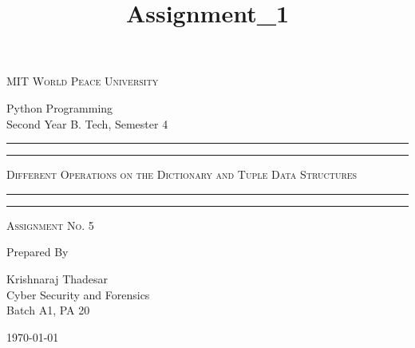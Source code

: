 \documentclass[11pt]{article}
\title{Assignment\_1}
\begin{document}
\begin{titlepage}
	\centering


	\huge\textsc{
		MIT World Peace University
	}\\

	\vspace{0.75\baselineskip} %

	\LARGE{
		Python Programming\\
		Second Year B. Tech, Semester 4
	}

	\vfill %


	\rule{\textwidth}{1.6pt}\vspace*{-\baselineskip}\vspace*{2pt}
	\rule{\textwidth}{0.6pt}
	\vspace{0.75\baselineskip} %



	\huge{\textsc{
			Different Operations on the Dictionary and Tuple Data Structures
		}} \\



	\vspace{0.5\baselineskip} %
	\rule{\textwidth}{0.6pt}\vspace*{-\baselineskip}\vspace*{2.8pt}
	\rule{\textwidth}{1.6pt}

	\vspace{1\baselineskip} %


	\LARGE\textsc{
		Assignment No. 5
	} %
	\vfill


	Prepared By
	\vspace{0.5\baselineskip} %

	\Large{
		Krishnaraj Thadesar \\
		Cyber Security and Forensics\\
		Batch A1, PA 20
	}


	\vspace{0.5\baselineskip} %
	\today

\end{titlepage}
\end{document}
